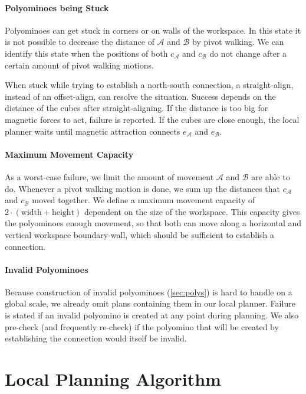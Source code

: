 \paragraph{Polyominoes being Stuck}

Polyominoes can get stuck in corners or on walls of the workspace.
In this state it is not possible to decrease the distance of $\mathcal{A}$ and $\mathcal{B}$ by pivot walking.
We can identify this state when the positions  of both $c_\mathcal{A}$ and $c_\mathcal{B}$ do not change after a certain amount of pivot walking motions.

When stuck while trying to establish a north-south connection, a straight-align, instead of an offset-align, can resolve the situation.
Success depends on the distance of the cubes after straight-aligning.
If the distance is too big for magnetic forces to act, failure is reported.
If the cubes are close enough, the local planner waits until magnetic attraction connects $e_\mathcal{A}$ and $e_\mathcal{B}$.

\paragraph{Maximum Movement Capacity}

As a worst-case failure, we limit the amount of movement $\mathcal{A}$ and $\mathcal{B}$ are able to do.
Whenever a pivot walking motion is done, we sum up the distances that $c_\mathcal{A}$ and $c_\mathcal{B}$ moved together.
We define a maximum movement capacity of $2\cdot(\text{width} + \text{height})$ dependent on the size of the workspace.
This capacity gives the polyominoes enough movement, so that both can move along a horizontal and vertical workspace boundary-wall, which should be sufficient to establish a connection.

\paragraph{Invalid Polyominoes}

Because construction of invalid polyominoes (\autoref{sec:polys}) is hard to handle on a global scale, we already omit plans containing them in our local planner.
Failure is stated if an invalid polyomino is created at any point during planning.
We also pre-check (and frequently re-check) if the polyomino that will be created by establishing the connection would itself be invalid. 


\section{Local Planning Algorithm}
\label{sec:local_algo}

